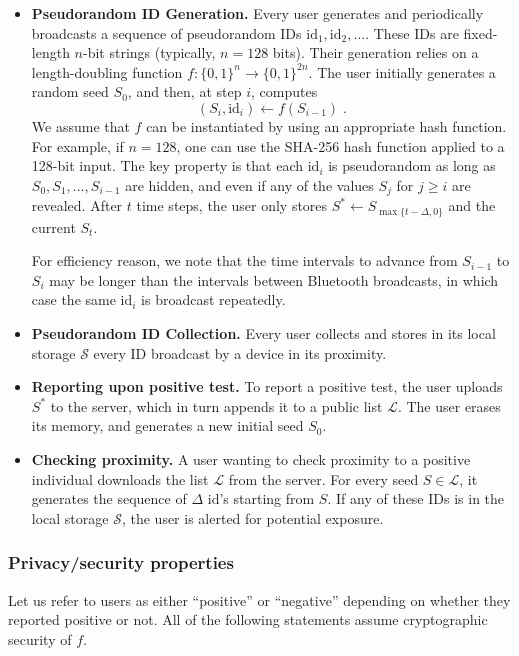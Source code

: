 \documentclass{article}
\begin{document}
\newcommand{\id}{\mathrm{id}}
\begin{itemize}
    \item {\bf Pseudorandom ID Generation.} Every user generates and periodically broadcasts a sequence of pseudorandom IDs $\id_1, \id_2, \ldots$. These IDs are fixed-length $n$-bit strings (typically, $n = 128$ bits). Their generation relies on a length-doubling function $f: \{0,1\}^n \to \{0,1\}^{2n}$. The user initially generates a random seed $S_0$, and then, at step $i$, computes
\begin{displaymath}
(S_i, \id_i) \gets f(S_{i-1}) \;.
\end{displaymath}
We assume that $f$ can be instantiated by using an appropriate hash function. For example, if $n = 128$, one can use the SHA-256 hash function applied to a 128-bit input. The key property is that each $\id_i$ is pseudorandom  as long as $S_0, S_1, \ldots, S_{i-1}$ are hidden, and even if any of the values $S_j$ for $j \geq i$ are revealed. After $t$ time steps, the user only stores $S^* \gets S_{\max\{t-\Delta,0\}}$ and the current $S_t$. 

For efficiency reason, we note that the time intervals to advance from $S_{i-1}$ to $S_i$ may be longer than the intervals between Bluetooth broadcasts, in which case the same $\id_i$ is broadcast repeatedly. 
\item {\bf Pseudorandom ID Collection.} Every user  collects and stores in its local storage $\mathcal{S}$ every ID broadcast by a device in its proximity.
\item {\bf Reporting upon positive test.} To report a positive test, the user uploads $S^*$ to the server, which in turn appends it to a public list $\mathcal{L}$. The user erases its memory, and generates a new initial seed $S_0$.
\item {\bf Checking proximity.} A user wanting to check proximity to a positive individual downloads the list $\mathcal{L}$ from the server. For every seed $S \in \mathcal{L}$, it generates the sequence of $\Delta$ $\id$'s starting from $S$. If any of these IDs is in the local storage $\mathcal{S}$, the user is alerted for potential exposure.
\end{itemize}



\subsubsection{Privacy/security properties}

Let us refer to users as either ``positive'' or ``negative'' depending on whether they reported positive or not. All of the following statements assume cryptographic security of $f$.
\end{document}
